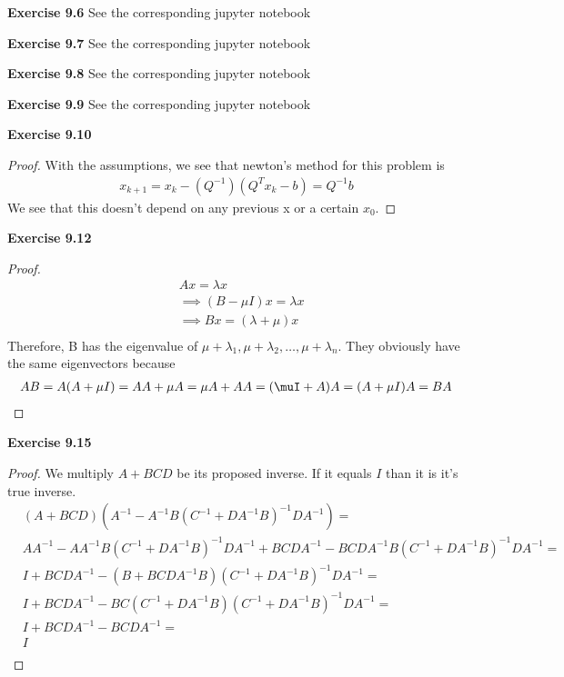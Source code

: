 \documentclass[letterpaper,12pt]{article}
\theoremstyle{definition}
\begin{document}
\noindent\textbf{Exercise 9.6}
See the corresponding jupyter notebook

\noindent\textbf{Exercise 9.7}
See the corresponding jupyter notebook

\noindent\textbf{Exercise 9.8}
See the corresponding jupyter notebook

\noindent\textbf{Exercise 9.9}
See the corresponding jupyter notebook

\noindent\textbf{Exercise 9.10}
\begin{proof}
	With the assumptions, we see that newton's method for this problem is
	\begin{align*}
		x_{k+1} = x_k - (Q^{-1})(Q^Tx_k - b)= Q^{-1}b
	\end{align*}
	We see that this doesn't depend on any previous x or a certain $x_0$.
\end{proof}

\noindent\textbf{Exercise 9.12}
\begin{proof}
	\begin{align*}
		& Ax = \lambda x \\
		& \implies (B - \mu I)x = \lambda x \\
		& \implies Bx = (\lambda + \mu)x \\
	\end{align*}
	Therefore, B has the eigenvalue of $\mu + \lambda_1, \mu + \lambda_2, \dots, \mu + \lambda_n$.  They obviously have the same eigenvectors because 
	\begin{align*}
		AB = A(A + \mu I ) = AA + \mu A = \mu A + AA = (\muI + A)A = (A + \mu I)A = BA
	\end{align*}
\end{proof}

\noindent\textbf{Exercise 9.15}
\begin{proof} 
We multiply $A + BCD$ be its proposed inverse.  If it equals $I$ than it is it's true inverse.
\begin{align*}
	& (A + BCD)(A^{-1} - A^{-1}B(C^{-1} + DA^{-1}B)^{-1}DA^{-1} )= \\
	& AA^{-1} - AA^{-1}B(C^{-1} + DA^{-1}B)^{-1}DA^{-1} + BCDA^{-1} - BCDA^{-1}B(C^{-1} + DA^{-1}B)^{-1}DA^{-1} = \\
	& I + BCDA^{-1} - (B + BCDA^{-1}B)(C^{-1} + DA^{-1}B)^{-1}DA^{-1} = \\
	& I + BCDA^{-1} - BC(C^{-1} + DA^{-1}B)(C^{-1} + DA^{-1}B)^{-1}DA^{-1} =\\
	& I + BCDA^{-1} - BCDA^{-1} = \\
	& I \\
\end{align*}
\end{proof}
\end{document}
